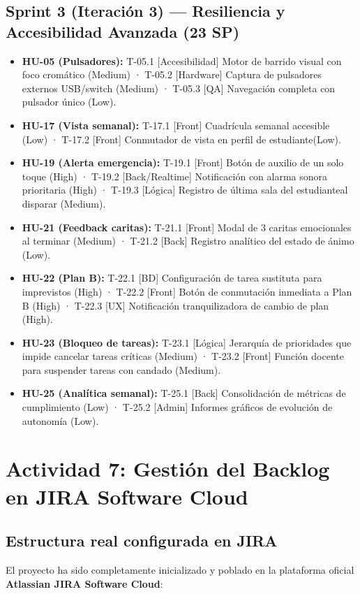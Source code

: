\documentclass[11pt,a4paper]{article}
\newcommand{\hl}[1]{\textcolor{gblue}{\textbf{#1}}}
\begin{document}
\subsection{Sprint 3 (Iteración 3) — Resiliencia y Accesibilidad Avanzada (23 SP)}
\begin{itemize}
\item \textbf{HU-05 (Pulsadores):} T-05.1 [Accesibilidad] Motor de barrido visual con foco cromático (Medium) · T-05.2 [Hardware] Captura de pulsadores externos USB/switch (Medium) · T-05.3 [QA] Navegación completa con pulsador único (Low).
\item \textbf{HU-17 (Vista semanal):} T-17.1 [Front] Cuadrícula semanal accesible (Low) · T-17.2 [Front] Conmutador de vista en perfil de estudiante(Low).
\item \textbf{HU-19 (Alerta emergencia):} T-19.1 [Front] Botón de auxilio de un solo toque (High) · T-19.2 [Back/Realtime] Notificación con alarma sonora prioritaria (High) · T-19.3 [Lógica] Registro de última sala del estudianteal disparar (Medium).
\item \textbf{HU-21 (Feedback caritas):} T-21.1 [Front] Modal de 3 caritas emocionales al terminar (Medium) · T-21.2 [Back] Registro analítico del estado de ánimo (Low).
\item \textbf{HU-22 (Plan B):} T-22.1 [BD] Configuración de tarea sustituta para imprevistos (High) · T-22.2 [Front] Botón de conmutación inmediata a Plan B (High) · T-22.3 [UX] Notificación tranquilizadora de cambio de plan (High).
\item \textbf{HU-23 (Bloqueo de tareas):} T-23.1 [Lógica] Jerarquía de prioridades que impide cancelar tareas críticas (Medium) · T-23.2 [Front] Función docente para suspender tareas con candado (Medium).
\item \textbf{HU-25 (Analítica semanal):} T-25.1 [Back] Consolidación de métricas de cumplimiento (Low) · T-25.2 [Admin] Informes gráficos de evolución de autonomía (Low).
\end{itemize}

\section{Actividad 7: Gestión del Backlog en JIRA Software Cloud}
\subsection{Estructura real configurada en JIRA}
El proyecto ha sido completamente inicializado y poblado en la plataforma oficial \hl{Atlassian JIRA Software Cloud}:
\end{document}
